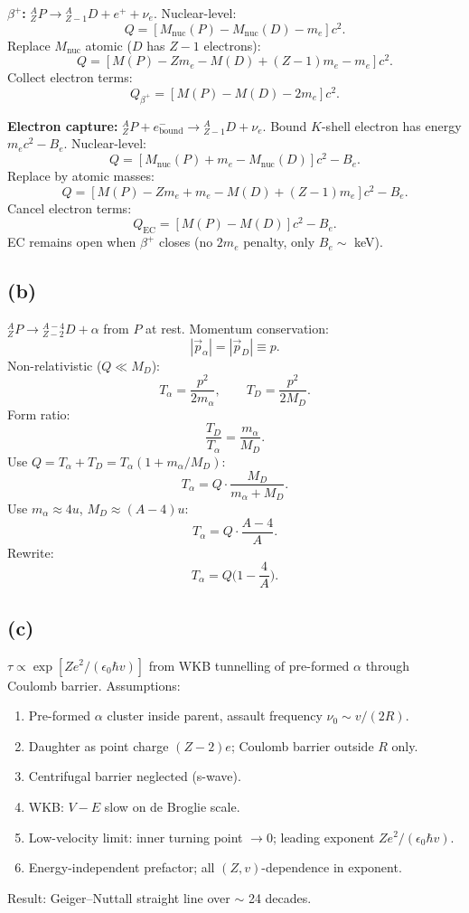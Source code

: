 \documentclass[11pt]{article}
\begin{document}
\textbf{$\beta^+$:} ${}^A_Z P\to {}^A_{Z-1} D + e^++\nu_e$. Nuclear-level:
\[ Q = [M_{\text{nuc}}(P) - M_{\text{nuc}}(D) - m_e]c^2. \]
Replace $M_{\text{nuc}}$ atomic ($D$ has $Z-1$ electrons):
\[ Q = [M(P) - Z m_e - M(D) + (Z-1)m_e - m_e]c^2. \]
Collect electron terms:
\[ \boxed{\;Q_{\beta^+} = [M(P) - M(D) - 2 m_e]c^2.\;} \]

\textbf{Electron capture:} ${}^A_Z P + e^-_{\text{bound}} \to {}^A_{Z-1} D + \nu_e$. Bound $K$-shell electron has energy $m_e c^2 - B_e$. Nuclear-level:
\[ Q = [M_{\text{nuc}}(P) + m_e - M_{\text{nuc}}(D)]c^2 - B_e. \]
Replace by atomic masses:
\[ Q = [M(P) - Z m_e + m_e - M(D) + (Z-1)m_e]c^2 - B_e. \]
Cancel electron terms:
\[ \boxed{\;Q_{\text{EC}} = [M(P)-M(D)]c^2 - B_e.\;} \]
EC remains open when $\beta^+$ closes (no $2 m_e$ penalty, only $B_e\sim$ keV).

\subsection*{(b)}

${}^A_Z P\to {}^{A-4}_{Z-2} D + \alpha$ from $P$ at rest. Momentum conservation:
\[ |\vec p_\alpha| = |\vec p_D| \equiv p. \]
Non-relativistic ($Q\ll M_D$):
\[ T_\alpha = \frac{p^2}{2 m_\alpha},\qquad T_D = \frac{p^2}{2 M_D}. \]
Form ratio:
\[ \frac{T_D}{T_\alpha} = \frac{m_\alpha}{M_D}. \]
Use $Q = T_\alpha + T_D = T_\alpha(1 + m_\alpha/M_D)$:
\[ T_\alpha = Q\cdot\frac{M_D}{m_\alpha + M_D}. \]
Use $m_\alpha\approx 4 u$, $M_D \approx (A-4) u$:
\[ T_\alpha = Q\cdot\frac{A-4}{A}. \]
Rewrite:
\[ \boxed{\;T_\alpha = Q\Big(1 - \frac{4}{A}\Big).\;} \]

\subsection*{(c)}

$\tau\propto \exp[Z e^2/(\epsilon_0 \hbar v)]$ from WKB tunnelling of pre-formed $\alpha$ through Coulomb barrier. Assumptions:
\begin{enumerate}
\item Pre-formed $\alpha$ cluster inside parent, assault frequency $\nu_0 \sim v/(2R)$.
\item Daughter as point charge $(Z-2)e$; Coulomb barrier outside $R$ only.
\item Centrifugal barrier neglected (s-wave).
\item WKB: $V-E$ slow on de Broglie scale.
\item Low-velocity limit: inner turning point $\to 0$; leading exponent $Ze^2/(\epsilon_0\hbar v)$.
\item Energy-independent prefactor; all $(Z,v)$-dependence in exponent.
\end{enumerate}
Result: Geiger--Nuttall straight line over $\sim$ 24 decades.
\end{document}
